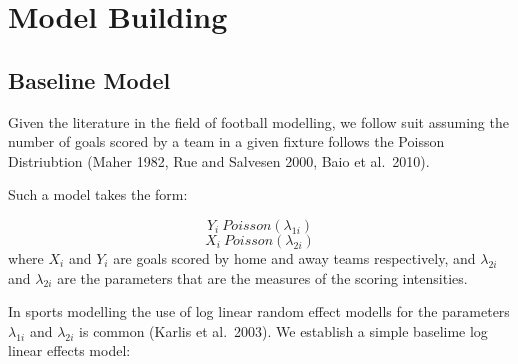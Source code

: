 \documentclass[
]{article}
\begin{document}
\hypertarget{section}{%
\subsection{}\label{section}}

\hypertarget{section-1}{%
\subsection{}\label{section-1}}

\hypertarget{section-2}{%
\subsection{}\label{section-2}}

\hypertarget{section-3}{%
\subsection{}\label{section-3}}

\hypertarget{section-4}{%
\subsection{}\label{section-4}}

\hypertarget{model-building}{%
\section{Model Building}\label{model-building}}

\hypertarget{baseline-model}{%
\subsection{Baseline Model}\label{baseline-model}}

Given the literature in the field of football modelling, we follow suit
assuming the number of goals scored by a team in a given fixture follows
the Poisson Distriubtion (Maher 1982, Rue and Salvesen 2000, Baio et
al.~2010).

Such a model takes the form:

\[Y_i ~ Poisson(\lambda_{1i}) \] \[X_i ~ Poisson(\lambda_{2i}) \] where
\(X_i\) and \(Y_i\) are goals scored by home and away teams
respectively, and \(\lambda_{2i}\) and \(\lambda_{2i}\) are the
parameters that are the measures of the scoring intensities.

In sports modelling the use of log linear random effect modells for the
parameters \(\lambda_{1i}\) and \(\lambda_{2i}\) is common (Karlis et
al.~2003). We establish a simple baselime log linear effects model:
\end{document}
